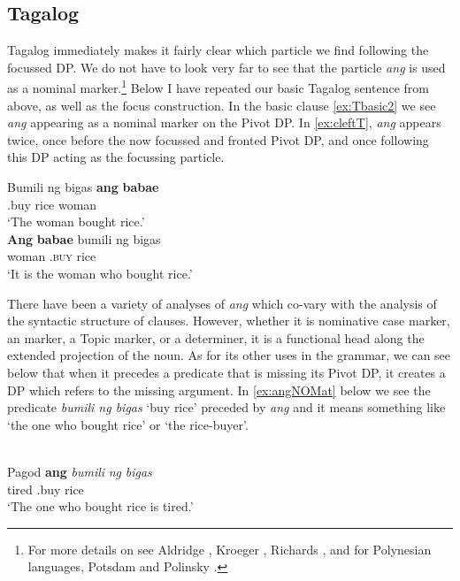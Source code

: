 \documentclass[output=paper]{langsci/langscibook}
\begin{document}
\subsection{Tagalog}

Tagalog immediately makes it fairly clear which particle we find following the
focussed DP.  We do not have to look very far to see that the particle
\emph{ang} is used as a nominal marker.\footnote{For more details on 
see Aldridge \citeyearpar{Aldridge:2013}, Kroeger \citeyearpar{Kroeger:1993},
Richards \citeyearpar{Richards:1998a}, and for Polynesian languages, Potsdam
and Polinsky \citeyearpar{Potsdam:2011a}.} Below I have repeated our basic
Tagalog sentence from above, as well as the focus construction.  In the basic
clause  \eqref{ex:Tbasic2} we see \emph{ang} appearing as a nominal marker on the
Pivot DP.  In  \eqref{ex:cleftT}, \emph{ang} appears twice, once before the now
focussed and fronted Pivot DP, and once following this DP acting as the
focussing particle.

\ea {}
    \ea
    \gll Bumili ng bigas \textbf{ang} \textbf{babae} \label{ex:Tbasic2}\\
    \At{}.buy \Acc{} rice \Nom{} woman\\
    \glt `The woman bought rice.'\\
    \ex
    \gll  \textbf{Ang} \textbf{babae}  bumili ng bigas\label{ex:cleftT}\\
    \Nom{} woman \Nom{} \At.\textsc{buy} \Acc{} rice\\
    \glt `It is the woman who bought rice.'
    \z
\z

There have been a variety of analyses of \emph{ang} which co-vary with the
analysis of the syntactic structure of  clauses.  However, whether it is
nominative case marker, an  marker, a Topic marker, or a
determiner, it is a functional head along the extended projection of the noun.
As for its other uses in the grammar, we can see below that when it precedes a
predicate that is missing its Pivot DP, it creates a DP which refers to the
missing argument.  In \eqref{ex:angNOMat} below we see the predicate \emph{bumili
ng bigas} `buy rice' preceded by \emph{ang} and it means something like `the
one who bought rice' or `the rice-buyer'.


\ea {}\\
    \gll Pagod \textbf{ang} \emph{bumili} \emph{ng} \emph{bigas}\label{ex:angNOMat}\\
    tired \Nom{} \At{}.buy \Acc{} rice\\
    \glt `The one who bought rice is tired.'
\z
\end{document}
